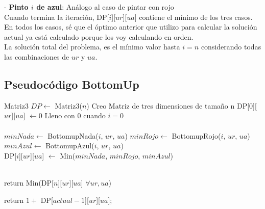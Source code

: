 - \textbf{Pinto $i$ de azul}:  Análogo al caso de pintar con rojo  \\

Cuando termina la iteración, DP[$i$][$ur$][$ua$] contiene el mínimo de los tres casos. En todos los casos, sé que el óptimo anterior que utilizo para calcular la solución actual ya está calculado porque los voy calculando en orden. \\

La solución total del problema, es el mínimo valor hasta $i = n$ considerando todas las combinaciones de $ur$ y $ua$.

\subsection{Pseudocódigo BottomUp}

\begin{algorithm}[H]
\begin{algorithmic}
  \State Matriz3 $DP \gets$ Matriz3($n$)  \Comment Creo Matriz de tres dimensiones de tamaño n 
  \State DP[$0$][$ur$][$ua$] $\gets 0$  \Comment Lleno con $0$ cuando $i = 0$ \\

             \\

                \State $minNada \gets$ BottomupNada($i$, $ur$, $ua$)
                \State $minRojo \gets$ BottomupRojo($i$, $ur$, $ua$)
                \State $minAzul \gets$ BottomupAzul($i$, $ur$, $ua$) \\  

                \State DP[$i$][$ur$][$ua$] $\gets$ Min($minNada$, $minRojo$, $minAzul$)
            
            \EndFor
        \EndFor
    \EndFor \\

    \State return Min(DP[$n$][$ur$][$ua$] $\forall ur, ua$)

\EndProcedure
\end{algorithmic}
\end{algorithm}


\begin{algorithm}[H]
\begin{algorithmic}
    \State return $1 +$ DP[$actual-1$][$ur$][$ua$];
\EndProcedure
\end{algorithmic}
\end{algorithm}



